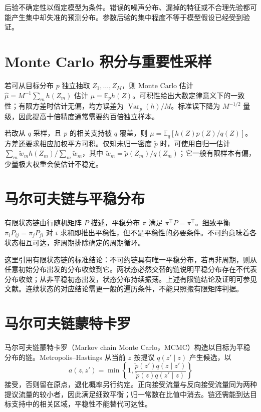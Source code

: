 \documentclass[UTF8,12pt,a4paper,fontset=fandol]{ctexbook}
\begin{document}
后验不确定性以假定模型为条件。错误的噪声分布、漏掉的特征或不合理先验都可能产生集中却失准的预测分布。参数后验的集中程度不等于模型假设已经受到验证。

\section{Monte Carlo 积分与重要性采样}

若可从目标分布 $p$ 独立抽取 $Z_1,\ldots,Z_M$，则 Monte Carlo 估计 $\widehat\mu=M^{-1}\sum_mh(Z_m)$ 估计 $\mu=\mathbb E_ph(Z)$。可积性给出大数定律意义下的一致性；有限方差时估计无偏，均方误差为 $\operatorname{Var}_p(h)/M$。标准误下降为 $M^{-1/2}$ 量级，因此提高十倍精度通常需要约百倍独立样本。

若改从 $q$ 采样，且 $p$ 的相关支持被 $q$ 覆盖，则 $\mu=\mathbb E_q[h(Z)p(Z)/q(Z)]$。方差还要求相应加权平方可积。仅知未归一密度 $\widetilde p$ 时，可使用自归一估计 $\sum_m\widetilde w_mh(Z_m)/\sum_m\widetilde w_m$，其中 $\widetilde w_m=\widetilde p(Z_m)/q(Z_m)$；它一般有限样本有偏，少量极大权重会使估计不稳定。

\section{马尔可夫链与平稳分布}

有限状态链由行随机矩阵 $P$ 描述，平稳分布 $\pi$ 满足 $\pi^\top P=\pi^\top$。细致平衡 $\pi_iP_{ij}=\pi_jP_{ji}$ 对 $i$ 求和即推出平稳性，但不是平稳性的必要条件。不可约意味着各状态相互可达，非周期排除确定的周期循环。

这里引用有限状态链的标准结论：不可约链具有唯一平稳分布，若再非周期，则从任意初始分布出发的分布收敛到它。两状态必然交替的链说明平稳分布存在不代表分布收敛；从非平稳初态出发，状态分布持续振荡。上述有限链结论及证明可参见文献\cite[第1、4章]{ml-markov}。连续状态的对应结论需更一般的遍历条件，不能只照搬有限矩阵判据。

\section{马尔可夫链蒙特卡罗}

马尔可夫链蒙特卡罗（Markov chain Monte Carlo，MCMC）构造以目标为平稳分布的链。Metropolis--Hastings 从当前 $z$ 按提议 $q(z'\mid z)$ 产生候选，以
\begin{equation}
 a(z,z')=\min\left\{1,\frac{\widetilde p(z')q(z\mid z')}
 {\widetilde p(z)q(z'\mid z)}\right\}
 \label{eq:ml-mh-acceptance}
\end{equation}
接受，否则留在原点，退化概率另行约定。正向接受流量与反向接受流量同为两种提议流量的较小者，因此满足细致平衡；归一常数在比值中消去。链还需能到达目标支持中的相关区域，平稳性不能替代可达性。
\end{document}
